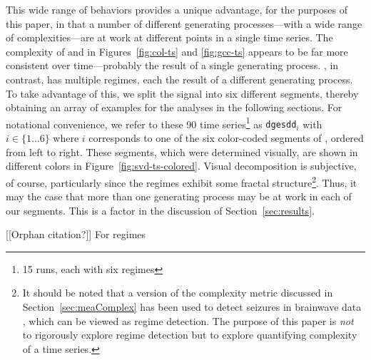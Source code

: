 This wide range of behaviors provides a unique advantage, for the
purposes of this paper, in that a number of different generating
processes---with a wide range of complexities---are at work at
different points in a single time series.  The complexity of \col and
\gcc in Figures~\ref{fig:col-ts} and \ref{fig:gcc-ts} appears to be
far more consistent over time---probably the result of a single
generating process.  \svd, in contrast, has multiple regimes, each the
result of a different generating process.  To take advantage of this,
we split the signal into six different segments, thereby obtaining an
array of examples for the analyses in the following sections.  For
notational convenience, we refer to these 90 time series\footnote{15
  runs, each with six regimes} as {\tt dgesdd$_i$} with $i \in
\{1\dots6\}$ where $i$ corresponds to one of the six color-coded
segments of \svd, ordered from left to right.  These segments, which
were determined visually, are shown in different colors in
Figure~\ref{fig:svd-ts-colored}.  Visual decomposition is subjective,
of course, particularly since the regimes exhibit some fractal
structure\footnote{It should be noted that a version of the complexity
  metric discussed in Section~\ref{sec:meaComplex} has been used to
  detect seizures in brainwave data \cite{cao2004det}, which can be
  viewed as regime detection.  The purpose of this paper is \emph{not}
  to rigorously explore regime detection but to explore quantifying
  complexity of a time series.}.  Thus, it may the case that more than
one generating process may be at work in each of our segments.  This
is a factor in the discussion of Section~\ref{sec:results}.

[[Orphan citation?]] For regimes \cite{cao2004det}
